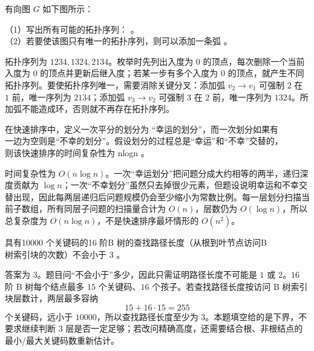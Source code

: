\begin{question}
有向图 $G$ 如下图所示：

\begin{center}
\end{center}

（1）写出所有可能的拓扑序列： \blank。\\
（2）若要使该图只有唯一的拓扑序列，则可以添加一条弧 \blank。\\
\begin{solution}
拓扑序列为 $1234,1324,2134$。枚举时先列出入度为 $0$ 的顶点，每次删除一个当前入度为 $0$ 的顶点并更新后继入度；若某一步有多个入度为 $0$ 的顶点，就产生不同拓扑序列。要使拓扑序列唯一，需要消除关键分叉：添加弧 $v_2\to v_1$ 可强制 $2$ 在 $1$ 前，唯一序列为 $2134$；添加弧 $v_3\to v_2$ 可强制 $3$ 在 $2$ 前，唯一序列为 $1324$。所加弧不能造成环，否则就不再存在拓扑序列。
\end{solution}
\end{question}

\begin{question}
在快速排序中，定义一次平分的划分为 “幸运的划分”，而一次划分如果有\\
一边为空则是“不幸的划分”。假设划分的过程总是“幸运”和“不幸”交替的，\\
则该快速排序的时间复杂性为         nlogn       。\\
\begin{solution}
时间复杂性为 $O(n\log n)$。一次“幸运划分”把问题分成大约相等的两半，递归深度贡献为 $\log n$；一次“不幸划分”虽然只去掉很少元素，但题设说明幸运和不幸交替出现，因此每两层递归后问题规模仍会至少缩小为常数比例。每一层划分扫描当前子数组，所有同层子问题的扫描量合计为 $O(n)$，层数仍为 $O(\log n)$，所以总复杂度为 $O(n\log n)$，不是快速排序最坏情形的 $O(n^2)$。
\end{solution}
\end{question}

\begin{question}
具有10000 个关键码的16 阶B 树的查找路径长度（从根到叶节点访问B\\
树索引块的次数）不会小于   3    。\\
\begin{solution}
答案为 $3$。题目问“不会小于”多少，因此只需证明路径长度不可能是 $1$ 或 $2$。$16$ 阶 B 树每个结点最多 $15$ 个关键码、$16$ 个孩子。若查找路径长度按访问 B 树索引块层数计，两层最多容纳
\[
15+16\cdot15=255
\]
个关键码，远小于 $10000$，所以查找路径长度至少为 $3$。本题填空给的是下界，不要求继续判断 $3$ 层是否一定足够；若改问精确高度，还需要结合根、非根结点的最小/最大关键码数重新估计。
\end{solution}
\end{question}

